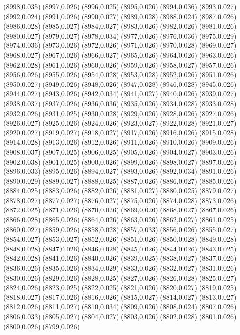 (8998,0.035)
(8997,0.026)
(8996,0.025)
(8995,0.026)
(8994,0.036)
(8993,0.027)
(8992,0.024)
(8991,0.026)
(8990,0.027)
(8989,0.028)
(8988,0.024)
(8987,0.026)
(8986,0.028)
(8985,0.027)
(8984,0.027)
(8983,0.026)
(8982,0.026)
(8981,0.026)
(8980,0.027)
(8979,0.027)
(8978,0.034)
(8977,0.026)
(8976,0.036)
(8975,0.029)
(8974,0.036)
(8973,0.026)
(8972,0.026)
(8971,0.026)
(8970,0.028)
(8969,0.027)
(8968,0.027)
(8967,0.026)
(8966,0.027)
(8965,0.026)
(8964,0.026)
(8963,0.026)
(8962,0.028)
(8961,0.026)
(8960,0.026)
(8959,0.026)
(8958,0.027)
(8957,0.026)
(8956,0.026)
(8955,0.026)
(8954,0.028)
(8953,0.028)
(8952,0.026)
(8951,0.026)
(8950,0.027)
(8949,0.026)
(8948,0.026)
(8947,0.028)
(8946,0.028)
(8945,0.026)
(8944,0.027)
(8943,0.026)
(8942,0.034)
(8941,0.027)
(8940,0.026)
(8939,0.027)
(8938,0.037)
(8937,0.026)
(8936,0.036)
(8935,0.026)
(8934,0.028)
(8933,0.028)
(8932,0.026)
(8931,0.025)
(8930,0.028)
(8929,0.026)
(8928,0.026)
(8927,0.026)
(8926,0.027)
(8925,0.026)
(8924,0.026)
(8923,0.027)
(8922,0.028)
(8921,0.027)
(8920,0.027)
(8919,0.027)
(8918,0.027)
(8917,0.026)
(8916,0.026)
(8915,0.028)
(8914,0.028)
(8913,0.026)
(8912,0.026)
(8911,0.026)
(8910,0.026)
(8909,0.026)
(8908,0.037)
(8907,0.025)
(8906,0.025)
(8905,0.026)
(8904,0.027)
(8903,0.026)
(8902,0.038)
(8901,0.025)
(8900,0.026)
(8899,0.026)
(8898,0.027)
(8897,0.026)
(8896,0.033)
(8895,0.026)
(8894,0.027)
(8893,0.026)
(8892,0.034)
(8891,0.026)
(8890,0.029)
(8889,0.027)
(8888,0.025)
(8887,0.026)
(8886,0.027)
(8885,0.026)
(8884,0.025)
(8883,0.026)
(8882,0.026)
(8881,0.027)
(8880,0.025)
(8879,0.027)
(8878,0.027)
(8877,0.027)
(8876,0.027)
(8875,0.026)
(8874,0.028)
(8873,0.026)
(8872,0.025)
(8871,0.026)
(8870,0.026)
(8869,0.026)
(8868,0.027)
(8867,0.026)
(8866,0.028)
(8865,0.026)
(8864,0.026)
(8863,0.026)
(8862,0.027)
(8861,0.025)
(8860,0.027)
(8859,0.026)
(8858,0.028)
(8857,0.033)
(8856,0.026)
(8855,0.027)
(8854,0.027)
(8853,0.027)
(8852,0.026)
(8851,0.026)
(8850,0.028)
(8849,0.028)
(8848,0.028)
(8847,0.026)
(8846,0.028)
(8845,0.026)
(8844,0.026)
(8843,0.025)
(8842,0.028)
(8841,0.026)
(8840,0.026)
(8839,0.025)
(8838,0.027)
(8837,0.026)
(8836,0.026)
(8835,0.026)
(8834,0.029)
(8833,0.026)
(8832,0.027)
(8831,0.026)
(8830,0.026)
(8829,0.026)
(8828,0.025)
(8827,0.026)
(8826,0.028)
(8825,0.027)
(8824,0.026)
(8823,0.025)
(8822,0.025)
(8821,0.026)
(8820,0.027)
(8819,0.025)
(8818,0.027)
(8817,0.026)
(8816,0.026)
(8815,0.027)
(8814,0.027)
(8813,0.027)
(8812,0.026)
(8811,0.027)
(8810,0.034)
(8809,0.026)
(8808,0.024)
(8807,0.026)
(8806,0.033)
(8805,0.027)
(8804,0.027)
(8803,0.026)
(8802,0.028)
(8801,0.026)
(8800,0.026)
(8799,0.026)
